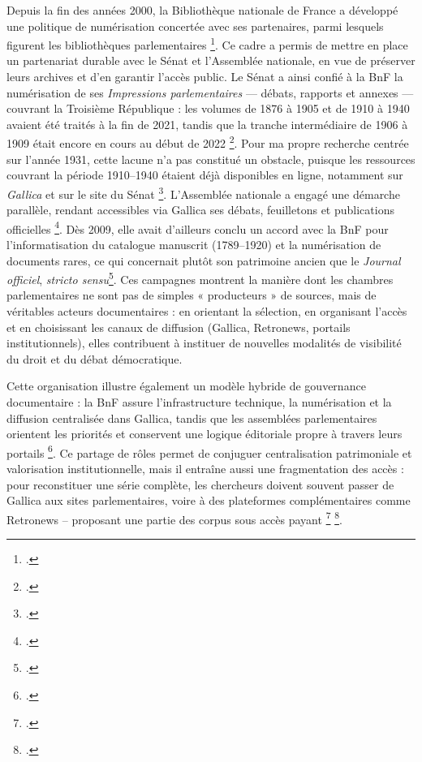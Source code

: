 Depuis la fin des années 2000, la Bibliothèque nationale de France a développé une politique de numérisation concertée avec ses partenaires, parmi lesquels figurent les bibliothèques parlementaires \footcite[][]{bnfpolitiquenum}. Ce cadre a permis de mettre en place un partenariat durable avec le Sénat et l’Assemblée nationale, en vue de préserver leurs archives et d’en garantir l’accès public. Le Sénat a ainsi confié à la BnF la numérisation de ses \emph{Impressions parlementaires} — débats, rapports et annexes — couvrant la Troisième République : les volumes de 1876 à 1905 et de 1910 à 1940 avaient été traités à la fin de 2021, tandis que la tranche intermédiaire de 1906 à 1909 était encore en cours au début de 2022 \footcite[][]{senat}. Pour ma propre recherche centrée sur l’année 1931, cette lacune n’a pas constitué un obstacle, puisque les ressources couvrant la période 1910–1940 étaient déjà disponibles en ligne, notamment sur \emph{Gallica} et sur le site du Sénat \footcite[][]{bnflibguide}. L’Assemblée nationale a engagé une démarche parallèle, rendant accessibles via Gallica ses débats, feuilletons et publications officielles \footcite[][]{bnflibguide}. Dès 2009, elle avait d’ailleurs conclu un accord avec la BnF pour l’informatisation du catalogue manuscrit (1789–1920) et la numérisation de documents rares, ce qui concernait plutôt son patrimoine ancien que le \emph{Journal officiel}, \emph{stricto sensu}\footcite[][]{wikipediaan}. Ces campagnes montrent la manière dont les chambres parlementaires ne sont pas de simples « producteurs » de sources, mais de véritables acteurs documentaires : en orientant la sélection, en organisant l’accès et en choisissant les canaux de diffusion (Gallica, Retronews, portails institutionnels), elles contribuent à instituer de nouvelles modalités de visibilité du droit et du débat démocratique. 

Cette organisation illustre également un modèle hybride de gouvernance documentaire : la BnF assure l’infrastructure technique, la numérisation et la diffusion centralisée dans Gallica, tandis que les assemblées parlementaires orientent les priorités et conservent une logique éditoriale propre à travers leurs portails \footcite[][]{bnflibguide}. Ce partage de rôles permet de conjuguer centralisation patrimoniale et valorisation institutionnelle, mais il entraîne aussi une fragmentation des accès : pour reconstituer une série complète, les chercheurs doivent souvent passer de Gallica aux sites parlementaires, voire à des plateformes complémentaires comme Retronews -- proposant une partie des corpus sous accès payant \footcite[][]{ruiz}  \footcite[][]{wikipediabnfpart}.

